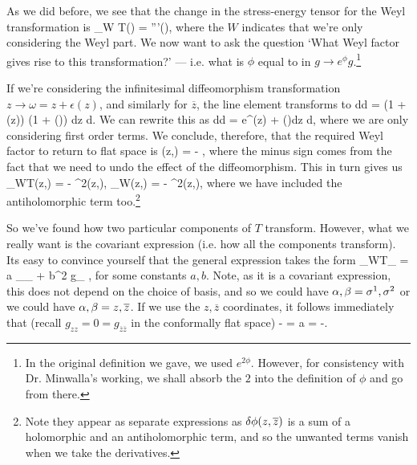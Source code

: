 As we did before, we see that the change in the stress-energy tensor for the Weyl transformation is
\bse 
    \del_W T(\omega) = \epsilon'''(\omega),
\ese
where the $W$ indicates that we're only considering the Weyl part. We now want to ask the question `What Weyl factor gives rise to this transformation?' --- i.e. what is $\phi$ equal to in $g \to e^{\phi}g$.\footnote{In the original definition we gave, we used $e^{2\phi}$. However, for consistency with Dr. Minwalla's working, we shall absorb the $2$ into the definition of $\phi$ and go from there.} 

If we're considering the infinitesimal diffeomorphism transformation $z \to \omega = z +\epsilon(z)$, and similarly for $\overline{z}$, the line element transforms to
\bse 
    d\omega d\overline{\omega} = \big(1 + \p\epsilon(z)\big) \big(1 + \overline{\p}\overline{\epsilon}()\big) dz d.
\ese 
We can rewrite this as 
\bse 
    d\omega d\overline{\omega} = e^{\p\epsilon(z) + \overline{\p}\overline{\epsilon}()}dz d,
\ese 
where we are only considering first order terms. We conclude, therefore, that the required Weyl factor to return to flat space is 
\bse 
    \del\phi(z,) = - ,
\ese 
where the minus sign comes from the fact that we need to undo the effect of the diffeomorphism. This in turn gives us 
\bse 
    \del_WT(z,) = - \p^2\del\phi(z,), \qquad {} \qquad \del_W(z,) = - \overline{\p}^2\del\phi(z,),
\ese
where we have included the antiholomorphic term too.\footnote{Note they appear as separate expressions as $\delta\phi(z,\overline{z})$ is a sum of a holomorphic and an antiholomorphic term, and so the unwanted terms vanish when we take the derivatives.}

So we've found how two particular components of $T$ transform. However, what we really want is the covariant expression (i.e. how all the components transform). Its easy to convince yourself that the general expression takes the form 
\bse 
    \del_WT_{\a\beta} = a \p_{\a}\p_{\beta} \del\phi + b\nabla^2 g_{\a\beta} \del\phi,
\ese 
for some constants $a,b$. Note, as it is a covariant expression, this does not depend on the choice of basis, and so we could have $\alpha,\beta = \sigma^1,\sigma^2$ or we could have $\alpha,\beta=z,\overline{z}$. If we use the $z,\overline{z}$ coordinates, it follows immediately that (recall $g_{zz} = 0 = g_{\overline{z}\overline{z}}$ in the conformally flat space)
\bse 
    - = a = -.
\ese 

